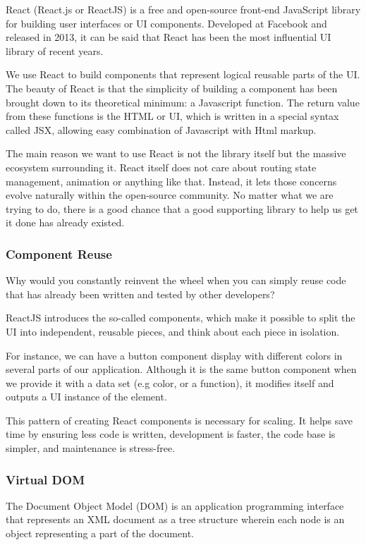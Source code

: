 \documentclass[a4paper]{article}
\numberwithin{equation}{section}
\begin{document}
React (React.js or ReactJS) is a free and open-source front-end JavaScript library for building user interfaces or UI components.
Developed at Facebook and released in 2013, it can be said that React has been the most influential UI library of recent years.

We use React to build components that represent logical reusable parts of the UI\@.
The beauty of React is that the simplicity of building a component has been brought down to its theoretical minimum: a Javascript function.
The return value from these functions is the HTML or UI, which is written in a special syntax called JSX, allowing easy combination of Javascript with Html markup.

The main reason we want to use React is not the library itself but the massive ecosystem surrounding it.
React itself does not care about routing state management, animation or anything like that.
Instead, it lets those concerns evolve naturally within the open-source community.
No matter what we are trying to do, there is a good chance that a good supporting library to help us get it done has already existed.

\subsubsection{Component Reuse}
Why would you constantly reinvent the wheel when you can simply reuse code that has already been written and tested by other developers?

ReactJS introduces the so-called components, which make it possible to split the UI into independent, reusable pieces, and think about each piece in isolation.

For instance, we can have a button component display with different colors in several parts of our application.
Although it is the same button component when we provide it with a data set (e.g color, or a function), it modifies itself and outputs a UI instance of the element.

This pattern of creating React components is necessary for scaling.
It helps save time by ensuring less code is written, development is faster, the code base is simpler, and maintenance is stress-free.

\subsubsection{Virtual DOM}
The Document Object Model (DOM) is an application programming interface that represents an XML document as a tree structure wherein each node is an object representing a part of the document.
\end{document}

